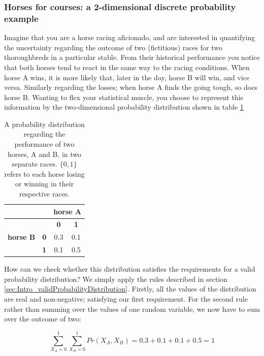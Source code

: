 \documentclass[11pt,fullpage]{book}
\begin{document}
\subsubsection{Horses for courses: a 2-dimensional discrete probability example}\label{sec:Intro_biasedCoinsTwoDimensionalDiscrete}
Imagine that you are a horse racing aficionado, and are interested in quantifying the uncertainty regarding the outcome of two (fictitious) races for two thoroughbreds in a particular stable. From their historical performance you notice that both horses tend to react in the same way to the racing conditions. When horse A wins, it is more likely that, later in the day, horse B will win, and vice versa. Similarly regarding the losses; when horse A finds the going tough, so does horse B. Wanting to flex your statistical muscle, you choose to represent this information by the two-dimensional probability distribution shown in table \ref{tab:Intro_coinBiased}

\begin{table}[htbp]
  \centering
    \begin{tabular}{rrcc}
    \toprule
          &       & \multicolumn{2}{c}{\textbf{horse A}} \\
    \midrule
          &       & \textbf{0} & \textbf{1} \\
    \multicolumn{1}{c}{\textbf{horse B}} & \multicolumn{1}{c}{\textbf{0}} & 0.3   & 0.1 \\
    \multicolumn{1}{c}{} & \multicolumn{1}{c}{\textbf{1}} & 0.1   & 0.5 \\
    \bottomrule
    \end{tabular}%
  \caption{A probability distribution regarding the performance of two horses, A and B, in two separate races. $\{0,1\}$ refers to each horse losing or winning in their respective races.}\label{tab:Intro_coinBiased}
\end{table}

How can we check whether this distribution satisfies the requirements for a valid probability distribution? We simply apply the rules described in section \ref{sec:Intro_validProbabilityDistribution}. Firstly, all the values of the distribution are real and non-negative; satisfying our first requirement. For the second rule rather than summing over the values of one random variable, we now have to sum over the outcome of two:

\begin{equation}\label{eq:Intro_discreteTwoDimensionalCoinSum}
\sum\limits_{X_A=0}^{1}\sum\limits_{X_B=0}^{1} Pr(X_A,X_B) = 0.3 + 0.1 + 0.1 + 0.5 = 1
\end{equation}
\end{document}
